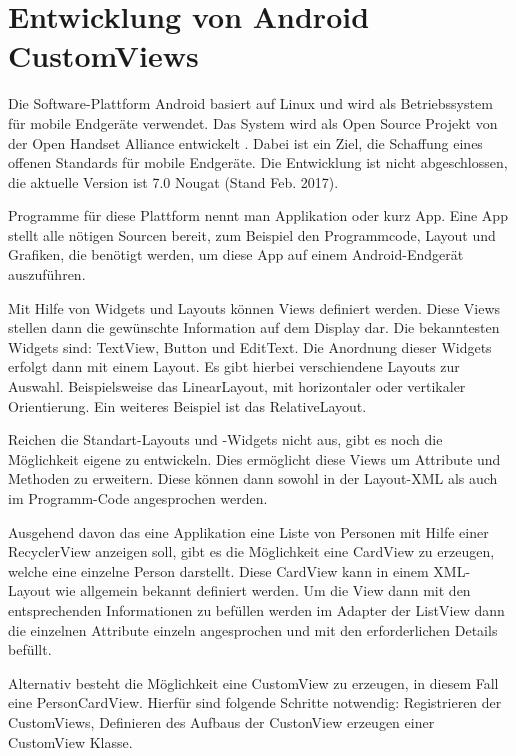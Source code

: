 \section{Entwicklung von Android CustomViews}\label{sec:custom_view}
Die Software-Plattform Android basiert auf Linux und wird als Betriebssystem für mobile Endgeräte verwendet.
Das System wird als Open Source Projekt von der Open Handset Alliance entwickelt \cite{open_handset_alliance}. Dabei ist ein Ziel, die Schaffung eines offenen Standards für mobile Endgeräte.
Die Entwicklung ist nicht abgeschlossen, die aktuelle Version ist 7.0 Nougat (Stand Feb. 2017).

Programme für diese Plattform nennt man Applikation oder kurz App. Eine App stellt alle nötigen Sourcen bereit, zum Beispiel den Programmcode, Layout und Grafiken, die benötigt werden, um diese App auf einem Android-Endgerät auszuführen.

Mit Hilfe von Widgets und Layouts können Views definiert werden. Diese Views stellen dann die gewünschte Information auf dem Display dar. Die bekanntesten Widgets sind: TextView, Button und EditText. Die Anordnung dieser Widgets erfolgt dann mit einem Layout. Es gibt hierbei verschiendene Layouts zur Auswahl. Beispielsweise das LinearLayout, mit horizontaler oder vertikaler Orientierung. Ein weiteres Beispiel ist das RelativeLayout.

Reichen die Standart-Layouts und -Widgets nicht aus, gibt es noch die Möglichkeit eigene zu entwickeln. Dies ermöglicht diese Views um Attribute und Methoden zu erweitern. Diese können dann sowohl in der Layout-XML als auch im Programm-Code angesprochen werden.

Ausgehend davon das eine Applikation eine Liste von Personen mit Hilfe einer RecyclerView anzeigen soll, gibt es die Möglichkeit eine CardView zu erzeugen, welche eine einzelne Person darstellt. Diese CardView kann in einem XML-Layout wie allgemein bekannt definiert werden. Um die View dann mit den entsprechenden Informationen zu befüllen werden im Adapter der ListView dann die einzelnen Attribute einzeln angesprochen und mit den erforderlichen Details befüllt.

Alternativ besteht die Möglichkeit eine CustomView zu erzeugen, in diesem Fall eine PersonCardView.
Hierfür sind folgende Schritte notwendig: Registrieren der CustomViews, Definieren des Aufbaus der CustonView erzeugen einer CustomView Klasse.

